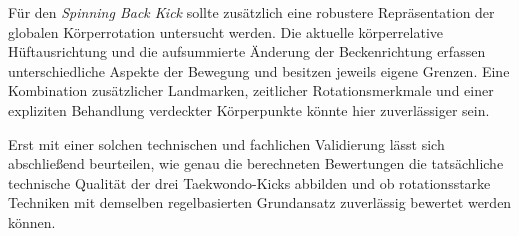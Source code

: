 \documentclass[intern]{cgMA}
\begin{document}
Für den \textit{Spinning Back Kick} sollte zusätzlich eine robustere Repräsentation der globalen Körperrotation untersucht werden. Die aktuelle körperrelative Hüftausrichtung und die aufsummierte Änderung der Beckenrichtung erfassen unterschiedliche Aspekte der Bewegung und besitzen jeweils eigene Grenzen. Eine Kombination zusätzlicher Landmarken, zeitlicher Rotationsmerkmale und einer expliziten Behandlung verdeckter Körperpunkte könnte hier zuverlässiger sein.

Erst mit einer solchen technischen und fachlichen Validierung lässt sich abschließend beurteilen, wie genau die berechneten Bewertungen die tatsächliche technische Qualität der drei Taekwondo-Kicks abbilden und ob rotationsstarke Techniken mit demselben regelbasierten Grundansatz zuverlässig bewertet werden können.
\end{document}
